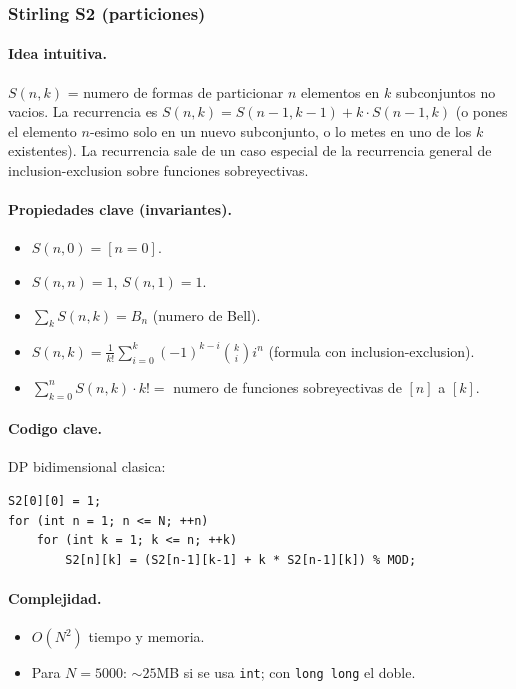 ﻿\subsubsection{Stirling S2 (particiones)}

\paragraph{Idea intuitiva.}
$S(n, k)$ = numero de formas de particionar $n$ elementos en $k$ subconjuntos no vacios. La recurrencia es $S(n, k) = S(n-1, k-1) + k \cdot S(n-1, k)$ (o pones el elemento $n$-esimo solo en un nuevo subconjunto, o lo metes en uno de los $k$ existentes). La recurrencia sale de un caso especial de la recurrencia general de inclusion-exclusion sobre funciones sobreyectivas.

\paragraph{Propiedades clave (invariantes).}
\begin{itemize}\setlength\itemsep{0pt}
	\item $S(n, 0) = [n = 0]$.
	\item $S(n, n) = 1$, $S(n, 1) = 1$.
	\item $\sum_k S(n, k) = B_n$ (numero de Bell).
	\item $S(n, k) = \frac{1}{k!} \sum_{i=0}^{k} (-1)^{k-i} \binom{k}{i} i^n$ (formula con inclusion-exclusion).
	\item $\sum_{k=0}^{n} S(n, k) \cdot k! = $ numero de funciones sobreyectivas de $[n]$ a $[k]$.
\end{itemize}

\paragraph{Codigo clave.}
DP bidimensional clasica:
\begin{verbatim}
S2[0][0] = 1;
for (int n = 1; n <= N; ++n)
    for (int k = 1; k <= n; ++k)
        S2[n][k] = (S2[n-1][k-1] + k * S2[n-1][k]) % MOD;
\end{verbatim}

\paragraph{Complejidad.}
\begin{itemize}\setlength\itemsep{0pt}
	\item $O(N^2)$ tiempo y memoria.
	\item Para $N = 5000$: $\sim 25$MB si se usa \texttt{int}; con \texttt{long long} el doble.
\end{itemize}


